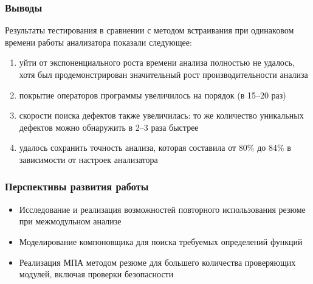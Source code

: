 \documentclass[14pt]{beamer}
\begin{document}
\begin{frame}[allowframebreaks]
\frametitle{Выводы}
Результаты тестирования в сравнении с методом встраивания при одинаковом времени работы анализатора показали следующее:
\begin{enumerate}
  \item уйти от экспоненциального роста времени анализа полностью не удалось, хотя был продемонстрирован значительный рост производительности анализа
  \item покрытие операторов программы увеличилось на порядок (в 15--20 раз)
  \item скорости поиска дефектов также увеличилась: то же количество уникальных дефектов можно обнаружить в 2--3 раза быстрее
  \item удалось сохранить точность анализа, которая составила от 80\% до 84\% в зависимости от настроек анализатора
\end{enumerate}
\end{frame}
\begin{frame}
\frametitle{Перспективы развития работы}
\begin{itemize}
  \item Исследование и реализация возможностей повторного использования резюме при межмодульном анализе
  \item Моделирование компоновщика для поиска требуемых определений функций
  \item Реализация МПА методом резюме для большего количества проверяющих модулей, включая проверки безопасности
\end{itemize}
\end{frame}
\end{document}
